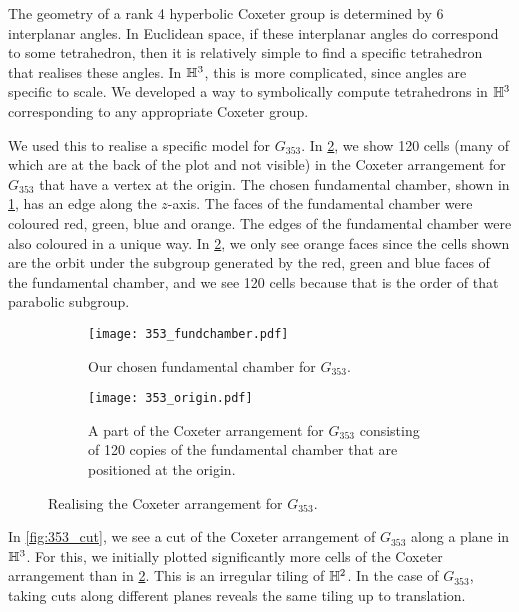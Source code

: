 The geometry of a rank 4 hyperbolic Coxeter group is determined by 6 interplanar angles.
In Euclidean space, if these interplanar angles do correspond to some tetrahedron, then it is relatively simple to find a specific tetrahedron that realises these angles.
In $\mathbb{H}^3$, this is more complicated, since angles are specific to scale.
We developed a way to symbolically compute tetrahedrons in $\mathbb{H}^3$ corresponding to any appropriate Coxeter group.

We used this to realise a specific model for $G_{353}$.
In \cref{fig:353_origin}, we show 120  cells (many of which are at the back of the plot and not visible) in the Coxeter arrangement for $G_{353}$ that have a vertex at the origin.
The chosen fundamental chamber, shown in \cref{fig:353_fund_chamber}, has an edge along the $z$-axis.
The faces of the fundamental chamber were coloured red, green, blue and orange.
The edges of the fundamental chamber were also coloured in a unique way.
In \cref{fig:353_origin}, we only see orange faces since the cells shown are the orbit under the subgroup generated by the red, green and blue faces of the fundamental chamber, and we see 120 cells because that is the order of that parabolic subgroup.

\begin{figure}
	\centering
	\begin{subfigure}[t]{.45\textwidth}
		\centering
		\texttt{[image: 353\_fundchamber.pdf]}
		\caption{Our chosen fundamental chamber for $G_{353}$.}
		\label{fig:353_fund_chamber}
	\end{subfigure}
	\hspace{0.2ex}
	\begin{subfigure}[t]{.45\textwidth}
		\centering
		\texttt{[image: 353\_origin.pdf]}
		\caption{A part of the Coxeter arrangement for $G_{353}$ consisting of 120 copies of the fundamental chamber that are positioned at the origin.}
		\label{fig:353_origin}
	\end{subfigure}%
	\caption{Realising the Coxeter arrangement for $G_{353}$.}
	\label{fig:test}
\end{figure}

In \cref{fig:353_cut}, we see a cut of the Coxeter arrangement of $G_{353}$ along a plane in  $\mathbb{H}^3$.
For this, we initially plotted significantly more cells of the Coxeter arrangement than in  \cref{fig:353_origin}.
This is an irregular tiling of $\mathbb{H}^2$.
In the case of  $G_{353}$, taking cuts along different planes reveals the same tiling up to translation.

